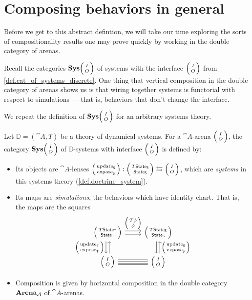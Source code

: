 \documentclass[DynamicalBook]{subfiles}
\begin{document}
\section{Composing behaviors in general}\label{sec.behaviors_general}

Before we get to this abstract defintion, we will take our time exploring the
sorts of compositionality results one may prove quickly by working in the double
category of arenas.

Recall the categories $\Cat{Sys}\lens{I}{O}$ of systems with the interface
$\lens{I}{O}$ from
\cref{def.cat_of_systems_discrete}. One thing that vertical composition in the
double category of arenas shows us is that wiring together systems is functorial
with respect to simulations --- that is, behaviors that don't change the
interface.

We repeat the definition of $\Cat{Sys}\lens{I}{O}$ for an arbitrary systems theory.
  \begin{definition}\label{def.cat_of_systems}
  Let $\mathbb{D} = (\cat{A}, T)$ be a theory of dynamical systems. For a
    $\cat{A}$-arena $\lens{I}{O}$, the category $\Cat{Sys}\lens{I}{O}$ of
    $\mathbb{D}$-systems with interface $\lens{I}{O}$ is defined by:
\begin{itemize}
  \item Its objects are $\cat{A}$-lenses $\lens{\update{S}}{\expose{S}} :
    \lens{T\State{S}}{\State{S}} \fromto \lens{I}{O}$, which are
    \emph{systems} in this systems theory (\cref{def.doctrine_system}).
  \item Its maps are \emph{simulations}, the behaviors which have identity
    chart. That is, the maps are the squares 
\[
    \begin{tikzcd}
      \lens{T\State{T}}{\State{T}} \ar[r, shift left, "\lens{T\phi}{\phi}"] \ar[r, shift right] \ar[d, shift right,
      "\lens{\update{T}}{\expose{T}}"'] \ar[d, shift left, leftarrow] &
      \lens{T\State{S}}{\State{S}} \ar[d, shift left, leftarrow,
      "\lens{\update{S}}{\expose{S}}"] \ar[d, shift right]\\
      \lens{I}{O} \ar[r, shift right, equals] \ar[r,
      shift left, equals] & \lens{I}{O}
    \end{tikzcd}
\]
\item Composition is given by horizontal composition in the double category
  $\textbf{Arena}_{\mathcal{A}}$ of $\cat{A}$-arenas.
\end{itemize}
  \end{definition}
\end{document}

